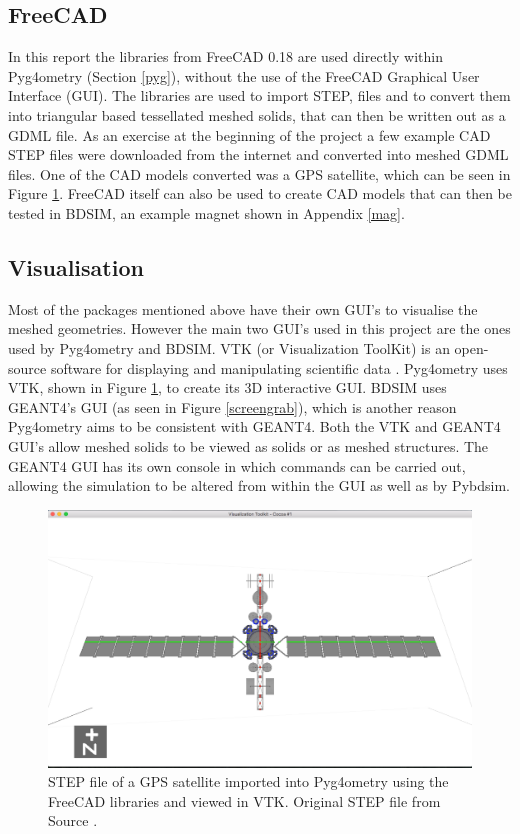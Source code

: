 \documentclass[12pt,a4paper]{article}
\begin{document}
\subsection{FreeCAD}
In this report the libraries from FreeCAD 0.18 \cite{18} are used directly within Pyg4ometry (Section \ref{pyg}), without the use of the FreeCAD Graphical User Interface (GUI). The libraries are used to import STEP, files and to convert them into triangular based tessellated meshed solids, that can then be written out as a GDML file. As an exercise at the beginning of the project a few example CAD STEP files were downloaded from the internet and converted into meshed GDML files. One of the CAD models converted was a GPS satellite, which can be seen in Figure \ref{sat}. FreeCAD itself can also be used to create CAD models that can then be tested in BDSIM, an example magnet shown in Appendix \ref{mag}.

\subsection{Visualisation}
\label{vis}
Most of the packages mentioned above have their own GUI's to visualise the meshed geometries. However the main two GUI's used in this project are the ones used by Pyg4ometry and BDSIM. VTK (or Visualization ToolKit) is an open-source software for displaying and manipulating scientific data \cite{vtk}. Pyg4ometry uses VTK, shown in Figure \ref{sat}, to create its 3D interactive GUI. BDSIM uses GEANT4's GUI (as seen in Figure \ref{screengrab}), which is another reason Pyg4ometry aims to be consistent with GEANT4. Both the VTK and GEANT4 GUI's allow meshed solids to be viewed as solids or as meshed structures. The GEANT4 GUI has its own console in which commands can be carried out, allowing the simulation to be altered from within the GUI as well as by Pybdsim.

\begin{figure}[h!]
\centering
\includegraphics[scale=0.4]{Images//VTK/sat.png}
\caption[width=\columnwidth]{STEP file of a GPS satellite imported into Pyg4ometry using the FreeCAD libraries and viewed in VTK. Original STEP file from Source \cite{sat}.}
\label{sat}
\end{figure}
\end{document}
